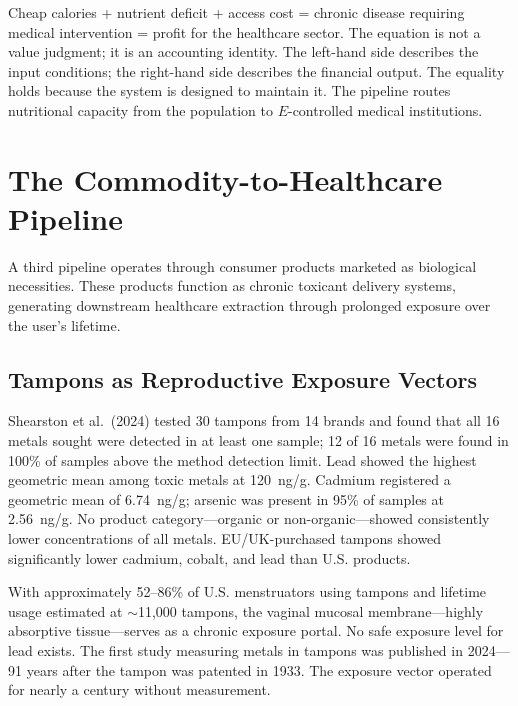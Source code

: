 Cheap calories + nutrient deficit + access cost = chronic disease requiring medical intervention = profit for the healthcare sector. The equation is not a value judgment; it is an accounting identity. The left-hand side describes the input conditions; the right-hand side describes the financial output. The equality holds because the system is designed to maintain it. The pipeline routes nutritional capacity from the population to $E$-controlled medical institutions.

\section{The Commodity-to-Healthcare Pipeline}
\label{sec:commodity_pipeline}

A third pipeline operates through consumer products marketed as biological necessities. These products function as chronic toxicant delivery systems, generating downstream healthcare extraction through prolonged exposure over the user's lifetime.

\subsection{Tampons as Reproductive Exposure Vectors}

Shearston et al.~(2024) tested 30 tampons from 14 brands and found that all 16 metals sought were detected in at least one sample; 12 of 16 metals were found in 100\% of samples above the method detection limit. Lead showed the highest geometric mean among toxic metals at 120~ng/g. Cadmium registered a geometric mean of 6.74~ng/g; arsenic was present in 95\% of samples at 2.56~ng/g. No product category---organic or non-organic---showed consistently lower concentrations of all metals. EU/UK-purchased tampons showed significantly lower cadmium, cobalt, and lead than U.S. products.

With approximately 52--86\% of U.S. menstruators using tampons and lifetime usage estimated at $\sim$11,000 tampons, the vaginal mucosal membrane---highly absorptive tissue---serves as a chronic exposure portal. No safe exposure level for lead exists. The first study measuring metals in tampons was published in 2024---91 years after the tampon was patented in 1933. The exposure vector operated for nearly a century without measurement.

